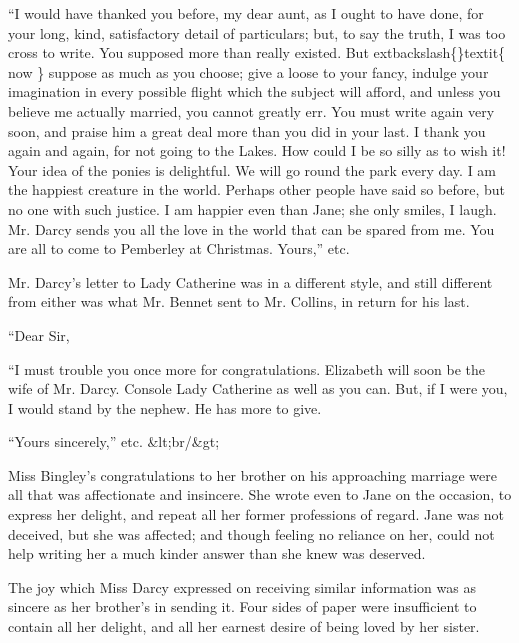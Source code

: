 \documentclass[10pt]{book}
\begin{document}
   “I would have thanked you before, my dear aunt, as I ought to have done,
for your long, kind, satisfactory detail of particulars; but, to say the
truth, I was too cross to write. You supposed more than really existed.
But
   	extbackslash\{\}textit\{
    now
   \}
   suppose as much as you choose; give a loose to your fancy,
indulge your imagination in every possible flight which the subject will
afford, and unless you believe me actually married, you cannot greatly
err. You must write again very soon, and praise him a great deal more
than you did in your last. I thank you again and again, for not going to
the Lakes. How could I be so
   silly as to wish it! Your idea of the
ponies is delightful. We will go round the park every day. I am the
happiest creature in the world. Perhaps other people have said so
before, but no one with such justice. I am happier even than Jane; she
only smiles, I laugh. Mr. Darcy sends you all the love in the world that
can be spared from me. You are all to come to Pemberley at Christmas.
Yours,” etc.
  

   Mr. Darcy’s letter to Lady Catherine was in a different style, and still
different from either was what Mr. Bennet sent to Mr. Collins, in return
for his last.
  

    “Dear Sir,
   

    “I must trouble you once more for congratulations. Elizabeth will
soon be the wife of Mr. Darcy. Console Lady Catherine as well as
you can. But, if I were you, I would stand by the nephew. He has
more to give.
   

    “Yours sincerely,” etc.
    &lt;br/&gt;

   Miss Bingley’s congratulations to her brother on his approaching
marriage were all that was affectionate and insincere. She wrote even to
Jane on the occasion, to express her delight, and repeat all her former
professions of regard. Jane was not deceived, but she was affected; and
though feeling no reliance on her, could not help writing her a much
kinder answer than she knew was deserved.
  

   The joy which Miss Darcy expressed on receiving similar information was
as sincere as her brother’s in sending it. Four sides of paper were
insufficient to contain all her delight, and all her earnest desire of
being loved by her sister.
  
\end{document}
